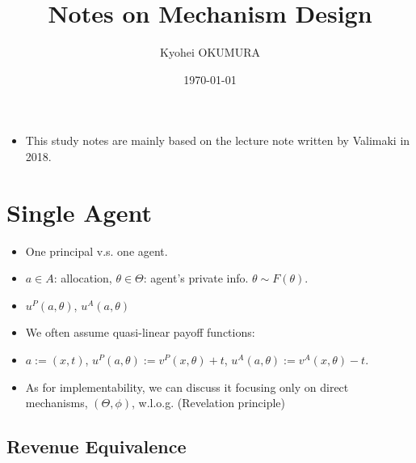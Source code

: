 \documentclass[11pt,a4paper,dvipdfmx]{article}
\theoremstyle{plain}
\newcommand{\1}{\mathbbm{1}}
\begin{document}
\title{Notes on Mechanism Design}
\author{Kyohei OKUMURA
}
\date{\today}
\maketitle

\begin{itemize}
	\item This study notes are mainly based on the lecture note written by Valimaki in 2018.
\end{itemize}

\section{Single Agent}
\begin{itemize}
	\item One principal v.s. one agent.
	\item $a \in A$: allocation, $\theta \in \Theta$: agent's private info. $\theta \sim F(\theta)$.
	\item $u^P(a, \theta)$, $u^A(a, \theta)$
	\item We often assume quasi-linear payoff functions:
	\item $a := (x, t)$, $u^P(a, \theta) := v^P(x, \theta) + t$, $u^A(a, \theta) := v^A(x, \theta) - t$.
	\item As for implementability, we can discuss it focusing only on direct mechanisms, $(\Theta, \phi)$, w.l.o.g. (Revelation principle)
\end{itemize}

\subsection{Revenue Equivalence}
\end{document}

